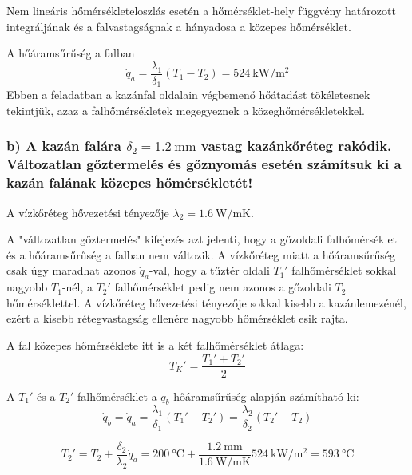 Nem lineáris hőmérsékleteloszlás esetén a hőmérséklet-hely függvény határozott integráljának és a falvastagságnak a hányadosa a közepes hőmérséklet.

A hőáramsűrűség a falban
\begin{equation}
	\dot{q}_a = \frac{\lambda_1}{\delta_1} (T_1 - T_2) = \SI{524}{\kilo\watt\per\meter\squared}
\end{equation}
Ebben a feladatban a kazánfal oldalain végbemenő hőátadást tökéletesnek tekintjük, azaz a falhőmérsékletek megegyeznek a közeghőmérsékletekkel.

\subsubsection*{b) A kazán falára $\delta_2 = \SI{1.2}{\milli\meter}$ vastag kazánkőréteg rakódik. Változatlan gőztermelés és gőznyomás esetén számítsuk ki a kazán falának közepes hőmérsékletét!}

A vízkőréteg hővezetési tényezője $\lambda_2 = \SI{1.6}{\watt\per\meter\kelvin}$.

\vspace{2mm}

A "változatlan gőztermelés" kifejezés azt jelenti, hogy a gőzoldali falhőmérséklet és a hőáramsűrűség a falban nem változik. A vízkőréteg miatt a hőáramsűrűség csak úgy maradhat azonos $\dot{q}_a$-val, hogy a tűztér oldali $T_1'$ falhőmérséklet sokkal nagyobb $T_1$-nél, a $T_2'$ falhőmérséklet pedig nem azonos a gőzoldali $T_2$ hőmérséklettel. A vízkőréteg hővezetési tényezője sokkal kisebb a kazánlemezénél, ezért a kisebb rétegvastagság ellenére nagyobb hőmérséklet esik rajta.

A fal közepes hőmérséklete itt is a két falhőmérséklet átlaga:
\begin{equation}
	T_K' = \frac{T_1' + T_2'}{2}
\end{equation}

A $T_1'$ és a $T_2'$ falhőmérséklet a $q_b$ hőáramsűrűség alapján számítható ki:
\begin{equation}
	\dot{q}_b = \dot{q}_a = \frac{\lambda_1}{\delta_1} (T_1' - T_2') = \frac{\lambda_2}{\delta_2} (T_2' - T_2)
\end{equation}

\begin{equation}
	T_2' = T_2 + \frac{\delta_2}{\lambda_2}\dot{q}_a = \SI{200}{\celsius} + \frac{\SI{1.2}{\milli\meter}}{\SI{1.6}{\watt\per\meter\kelvin}} \SI{524}{\kilo\watt\per\meter\squared} = \SI{593}{\celsius}
\end{equation}

